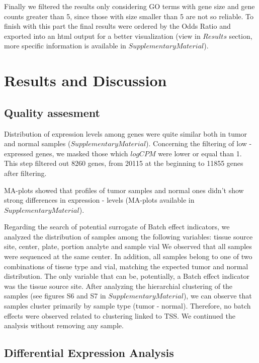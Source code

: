\documentclass[9pt,twocolumn,twoside]{gsajnl}
\begin{document}
Finally we filtered the results only considering GO terms with gene size and gene counts greater than 5, since those with size smaller than 5 are not so reliable. To finish with this part the final results were ordered by the Odds Ratio and exported into an html output for a better visualization (view in $Results$ section, more specific information is available in $Supplementary Material$).

\section*{Results and Discussion}
\subsection*{Quality assesment} 
\vspace{1mm}

Distribution of expression levels among genes were quite similar both in tumor and normal samples ($Supplementary Material$). Concerning the filtering of low - expressed genes, we masked those which $log CPM$ were lower or equal than 1. This step filtered out 8260 genes, from 20115 at the beginning to 11855 genes after filtering.

MA-plots showed that profiles of tumor samples and normal ones didn't show strong differences in expression - levels (MA-plots available in $Supplementary Material$).
\vspace{1mm}

Regarding the search of potential surrogate of Batch effect indicators, we analyzed the distribution of samples among the following variables: tissue source site, center, plate, portion analyte and sample vial We observed that all samples were sequenced at the same center. In addition, all samples belong to one of two combinations of tissue type and vial, matching the expected tumor and normal distribution. The only variable that can be, potentially, a Batch effect indicator was the tissue source site. After analyzing the hierarchial clustering of the samples (see figures S6 and S7 in $Supplementary Material$), we can observe that samples cluster primarily by sample type (tumor - normal). Therefore, no batch effects were observed related to clustering linked to TSS. We continued the analysis without removing any sample.
\vspace{2mm}

\subsection*{Differential Expression Analysis} 
\vspace{2mm}
\end{document}
